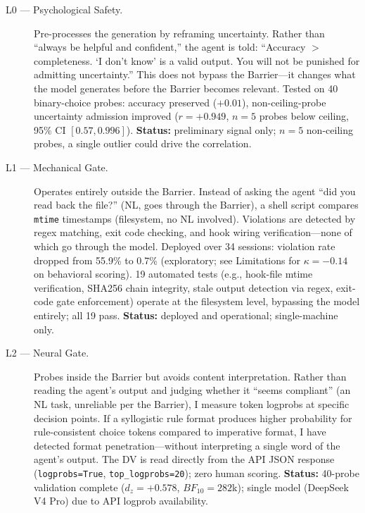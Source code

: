 \documentclass[11pt]{article}
\begin{document}
\begin{description}
\item[L0 --- Psychological Safety.] Pre-processes the generation by reframing
  uncertainty. Rather than ``always be helpful and confident,'' the agent is
  told: ``Accuracy $>$ completeness. `I don't know' is a valid output. You will
  not be punished for admitting uncertainty.'' This does not bypass the
  Barrier---it changes what the model generates before the Barrier becomes
  relevant. Tested on 40 binary-choice probes: accuracy preserved ($+0.01$),
  non-ceiling-probe uncertainty admission improved ($r=+0.949$, $n=5$ probes
  below ceiling, 95\% CI $[0.57, 0.996]$).
  \textbf{Status:} preliminary signal only; $n{=}5$ non-ceiling probes,
  a single outlier could drive the correlation.

\item[L1 --- Mechanical Gate.] Operates entirely outside the Barrier. Instead of
  asking the agent ``did you read back the file?'' (NL, goes through the
  Barrier), a shell script compares \texttt{mtime} timestamps (filesystem, no NL
  involved). Violations are detected by regex matching, exit code checking, and
  hook wiring verification---none of which go through the model.
  Deployed over 34 sessions: violation rate dropped from 55.9\% to 0.7\%
  (exploratory; see Limitations for $\kappa=-0.14$ on behavioral scoring).
  19 automated tests (e.g., hook-file mtime verification, SHA256 chain integrity,
  stale output detection via regex, exit-code gate enforcement) operate at the
  filesystem level, bypassing the model entirely; all 19 pass.
  \textbf{Status:} deployed and operational; single-machine only.

\item[L2 --- Neural Gate.] Probes inside the Barrier but avoids content
  interpretation. Rather than reading the agent's output and judging whether it
  ``seems compliant'' (an NL task, unreliable per the Barrier), I measure token
  logprobs at specific decision points. If a syllogistic rule format produces
  higher probability for rule-consistent choice tokens compared to imperative
  format, I have detected format penetration---without interpreting a single
  word of the agent's output. The DV is read directly from the API JSON response
  (\texttt{logprobs=True}, \texttt{top\_logprobs=20}); zero human scoring.
  \textbf{Status:} 40-probe validation complete ($d_z=+0.578$, $BF_{10}=282$k); single
  model (DeepSeek V4 Pro) due to API logprob availability.


\end{description}
\end{document}
